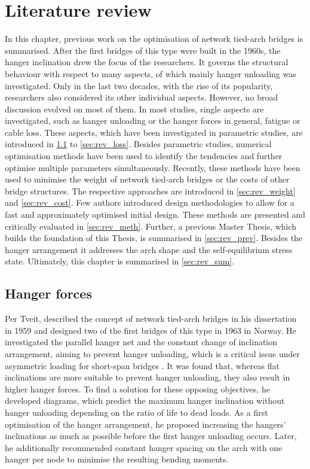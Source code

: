 \chapter{Literature review}\label{sec:review}
In this chapter, previous work on the optimisation of network tied-arch bridges is summarised. After the first bridges of this type were built in the 1960s, the hanger inclination drew the focus of the researchers. 
It governs the structural behaviour with respect to many aspects, of which mainly hanger unloading was investigated. Only in the last two decades, with the rise of its popularity, researchers also considered its other individual aspects. However, no broad discussion evolved on most of them. 
In most studies, single aspects are investigated, such as hanger unloading or the hanger forces in general, fatigue or cable loss.
These aspects, which have been investigated in parametric studies, are introduced in \cref{sec:rev_forces} to \cref{sec:rev_loss}. Besides parametric studies, numerical optimisation methods have been used to identify the tendencies and further optimise multiple parameters simultaneously. Recently, these methods have been used to minimise the weight of network tied-arch bridges or the costs of other bridge structures. The respective approaches are introduced in \cref{sec:rev_weight} and \cref{sec:rev_cost}. 
Few authors introduced design methodologies to allow for a fast and approximately optimised initial design. These methods are presented and critically evaluated in \cref{sec:rev_meth}. Further, a previous Master Thesis, which builds the foundation of this Thesis, is summarised in \cref{sec:rev_prev}. Besides the hanger arrangement it addresses the arch shape and the self-equilibrium stress state. Ultimately, this chapter is summarised in \cref{sec:rev_sum}.

\section{Hanger forces} \label{sec:rev_forces}
Per Tveit, described the concept of network tied-arch bridges in his dissertation in 1959 and designed two of the first bridges of this type in 1963 in Norway.
He investigated the parallel hanger net and the constant change of inclination arrangement, aiming to prevent hanger unloading, which is a critical issue under asymmetric loading for short-span bridges \cite{Tveit_66}.
It was found that, whereas flat inclinations are more suitable to prevent hanger unloading, they also result in higher hanger forces. To find a solution for these opposing objectives, he developed diagrams, which predict the maximum hanger inclination without hanger unloading depending on the ratio of life to dead loads. As a first optimisation of the hanger arrangement, he proposed increasing the hangers' inclinations as much as possible before the first hanger unloading occurs. Later, he additionally recommended constant hanger spacing on the arch with one hanger per node to minimise the resulting bending moments.  \medskip

